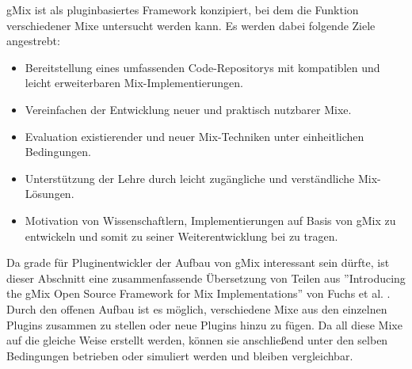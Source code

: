 \documentclass[a4paper, 11pt]{article} %
\begin{document}
gMix \cite{FHF12} ist als pluginbasiertes Framework konzipiert, bei dem die Funktion verschiedener Mixe untersucht werden kann. Es werden dabei folgende Ziele angestrebt:
\begin{itemize}
\item Bereitstellung eines umfassenden Code-Repositorys mit kompatiblen und leicht erweiterbaren Mix-Implementierungen. 
\item Vereinfachen der Entwicklung neuer und praktisch nutzbarer Mixe.
\item Evaluation existierender und neuer Mix-Techniken unter einheitlichen Bedingungen.
\item Unterstützung der Lehre durch leicht zugängliche und verständliche Mix-Lösungen.
\item Motivation von Wissenschaftlern, Implementierungen auf Basis von gMix zu entwickeln und somit zu seiner Weiterentwicklung bei zu tragen.
\end{itemize}

Da grade für Pluginentwickler der Aufbau von gMix interessant sein dürfte, ist dieser Abschnitt eine zusammenfassende Übersetzung von Teilen aus ''Introducing the gMix Open Source Framework
for Mix Implementations'' von Fuchs et al. \cite{FHF12}.\\

Durch den offenen Aufbau ist es möglich, verschiedene Mixe aus den einzelnen Plugins zusammen zu stellen oder neue Plugins hinzu zu fügen. Da all diese Mixe auf die gleiche Weise erstellt werden, können sie anschließend unter den selben Bedingungen betrieben oder simuliert werden und bleiben vergleichbar.
\\
\end{document}
